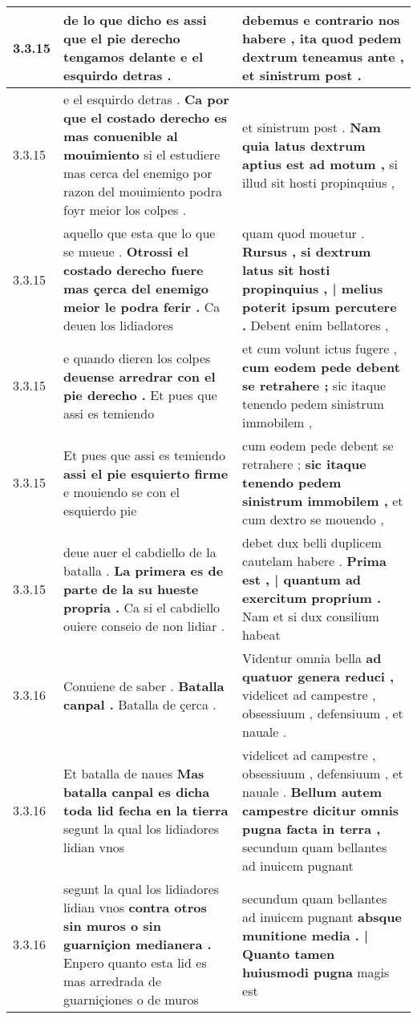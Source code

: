 \begin{tabular}{|p{1cm}|p{6.5cm}|p{6.5cm}|}
3.3.15 & de lo que dicho es \textbf{ assi que el pie derecho tengamos delante } e el esquirdo detras . & debemus e contrario nos habere , \textbf{ ita quod pedem dextrum teneamus ante , } et sinistrum post . \\\hline
3.3.15 & e el esquirdo detras . \textbf{ Ca por que el costado derecho es mas conuenible al mouimiento } si el estudiere mas cerca del enemigo por razon del mouimiento podra foyr meior los colpes . & et sinistrum post . \textbf{ Nam quia latus dextrum aptius est ad motum , } si illud sit hosti propinquius , \\\hline
3.3.15 & aquello que esta que lo que se mueue . \textbf{ Otrossi el costado derecho fuere mas çerca del enemigo meior le podra ferir . } Ca deuen los lidiadores & quam quod mouetur . \textbf{ Rursus , si dextrum latus sit hosti propinquius , | melius poterit ipsum percutere . } Debent enim bellatores , \\\hline
3.3.15 & e quando dieren los colpes \textbf{ deuense arredrar con el pie derecho . } Et pues que assi es temiendo & et cum volunt ictus fugere , \textbf{ cum eodem pede debent se retrahere ; } sic itaque tenendo pedem sinistrum immobilem , \\\hline
3.3.15 & Et pues que assi es temiendo \textbf{ assi el pie esquierto firme } e mouiendo se con el esquierdo pie & cum eodem pede debent se retrahere ; \textbf{ sic itaque tenendo pedem sinistrum immobilem , } et cum dextro se mouendo , \\\hline
3.3.15 & deue auer el cabdiello de la batalla . \textbf{ La primera es de parte de la su hueste propria . } Ca si el cabdiello ouiere conseio de non lidiar . & debet dux belli duplicem cautelam habere . \textbf{ Prima est , | quantum ad exercitum proprium . } Nam et si dux consilium habeat \\\hline
3.3.16 & Conuiene de saber . \textbf{ Batalla canpal . } Batalla de çerca . & Videntur omnia bella \textbf{ ad quatuor genera reduci , } videlicet ad campestre , obsessiuum , defensiuum , et nauale . \\\hline
3.3.16 & Et batalla de naues \textbf{ Mas batalla canpal es dicha toda lid fecha en la tierra } segunt la qual los lidiadores lidian vnos & videlicet ad campestre , obsessiuum , defensiuum , et nauale . \textbf{ Bellum autem campestre dicitur omnis pugna facta in terra , } secundum quam bellantes ad inuicem pugnant \\\hline
3.3.16 & segunt la qual los lidiadores lidian vnos \textbf{ contra otros sin muros o sin guarniçion medianera . } Enpero quanto esta lid es mas arredrada de guarniçiones o de muros & secundum quam bellantes ad inuicem pugnant \textbf{ absque munitione media . | Quanto tamen huiusmodi pugna } magis est \\\hline

\end{tabular}
